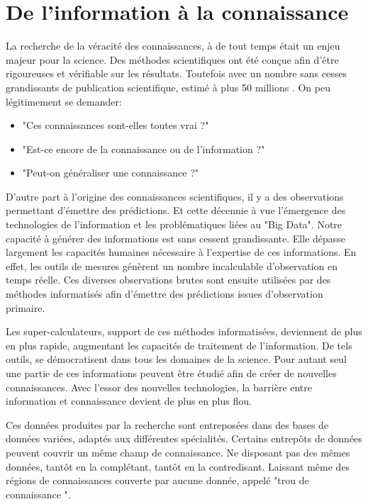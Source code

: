 \chapter*{De l'information à la connaissance}

La recherche de la véracité des connaissances, à de tout temps était un enjeu majeur pour la science. Des méthodes scientifiques ont été conçue afin d'être rigoureuses et vérifiable sur les résultats. Toutefois avec un nombre sans cesses grandissants de publication scientifique, estimé à plus 50 millions \citep[voir][]{LEAP:LEAP0509}. On peu légitimement se demander:
\begin{itemize}
	\item "Ces connaissances sont-elles toutes vrai ?"
	\item "Est-ce encore de la connaissance ou de l'information ?"
	\item "Peut-on généraliser une connaissance ?"
\end{itemize}

D'autre part à l'origine des connaissances scientifiques, il y a des observations permettant d'émettre des prédictions. Et cette décennie à vue l'émergence des technologies de l'information et les problématiques liées au "Big Data". Notre capacité à générer des informations est sans cessent grandissante. Elle dépasse largement les capacités humaines nécessaire à l'expertise de ces informations. En effet, les outils de mesures génèrent un nombre incalculable d'observation en temps réelle. Ces diverses observations brutes sont ensuite utilisées par des méthodes informatisés afin d'émettre des prédictions issues d'observation primaire.

Les super-calculateurs, support de ces méthodes informatisées, deviennent de plus en plus rapide, augmentant les capacités de traitement de l'information.  De tels outils, se démocratisent dans tous les domaines de la science. Pour autant seul une partie de ces informations peuvent être étudié afin de créer de nouvelles connaissances. Avec l'essor des nouvelles technologies, la barrière entre information et connaissance devient de plus en plus flou.


Ces données produites par la recherche sont entreposées dans des bases de données variées, adaptés aux différentes spécialités. Certains entrepôts de données peuvent couvrir un même champ de connaissance. Ne disposant pas des mêmes données, tantôt en la complétant, tantôt en la contredisant. Laissant même des régions de connaissances couverte par aucune donnée, appelé "trou de connaissance ".

